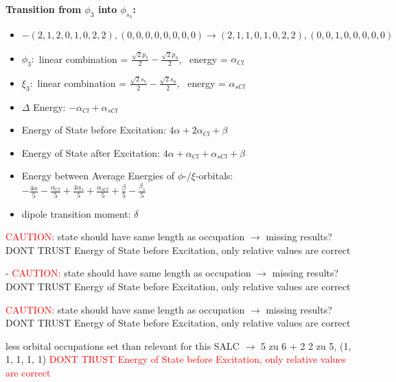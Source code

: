 \documentclass[12pt,a4paper]{article}
\begin{document}
        \noindent\textbf{Transition from $\phi_{3}$ into $\phi_{s_{3}}$:}
        \begin{itemize}
            \item $- (2, 1, 2, 0, 1, 0, 2, 2), (0, 0, 0, 0, 0, 0, 0, 0) \rightarrow (2, 1, 1, 0, 1, 0, 2, 2), (0, 0, 1, 0, 0, 0, 0, 0)$
        
            \item $\phi_{3}:$ linear combination = $\frac{\sqrt{2} p_{7}}{2} - \frac{\sqrt{2} p_{8}}{2}$, \
            energy = $\alpha_{Cl}$
            
            \item $\xi_{3}:$ linear combination = $\frac{\sqrt{2} s_{7}}{2} - \frac{\sqrt{2} s_{8}}{2}$, \
            energy = $\alpha_{s Cl}$
            
            \item $\Delta$ Energy: $- \alpha_{Cl} + \alpha_{s Cl}$
            \item Energy of State before Excitation: $4 \alpha + 2 \alpha_{Cl} + \beta$
            \item Energy of State after Excitation: $4 \alpha + \alpha_{Cl} + \alpha_{s Cl} + \beta$
            \item Energy between Average Energies of $\phi$-/$\xi$-orbitals: \
            $- \frac{4 \alpha}{5} - \frac{\alpha_{Cl}}{5} + \frac{4 \alpha_{s}}{5} + \frac{\alpha_{s Cl}}{5} + \frac{\beta}{5} - \frac{\beta_{s}}{5}$
        
            \item dipole transition moment: $\delta$
        
        \end{itemize}
        
	\textcolor{red}{CAUTION:} state should have same length as occupation $\rightarrow$ missing results?
	DONT TRUST \glqq{}Energy of State before Excitation\grqq{}, only relative values are correct

 - 	\textcolor{red}{CAUTION:} state should have same length as occupation $\rightarrow$ missing results?
	DONT TRUST \glqq{}Energy of State before Excitation\grqq{}, only relative values are correct

	\textcolor{red}{CAUTION:} state should have same length as occupation $\rightarrow$ missing results?
	DONT TRUST \glqq{}Energy of State before Excitation\grqq{}, only relative values are correct

less orbital occupations set than relevant for this SALC $\rightarrow$ 
5 zu 6 + 2 
2 zu 5, (1, 1, 1, 1, 1) 
\textcolor{red}{DONT TRUST \glqq{}Energy of State before Excitation\grqq{}, only relative values are correct}
\end{document}
